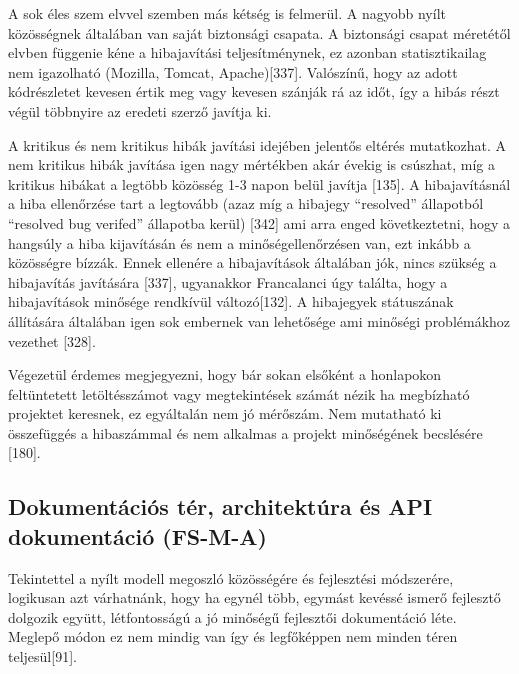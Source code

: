 \documentclass[12pt,magyar,a4paper,oneside]{scrreprt}
\begin{document}
A sok éles szem elvvel szemben más kétség is felmerül. A nagyobb nyílt
közösségnek általában van saját biztonsági csapata. A biztonsági csapat
méretétől elvben függenie kéne a hibajavítási teljesítménynek, ez
azonban statisztikailag nem igazolható (Mozilla, Tomcat,
Apache){[}337{]}. Valószínű, hogy az adott kódrészletet kevesen értik
meg vagy kevesen szánják rá az időt, így a hibás részt végül többnyire
az eredeti szerző javítja ki.

A kritikus és nem kritikus hibák javítási idejében jelentős eltérés
mutatkozhat. A nem kritikus hibák javítása igen nagy mértékben akár
évekig is csúszhat, míg a kritikus hibákat a legtöbb közösség 1-3 napon
belül javítja {[}135{]}. A hibajavításnál a hiba ellenőrzése tart a
legtovább (azaz míg a hibajegy ``resolved'' állapotból ``resolved bug
verifed'' állapotba kerül) {[}342{]} ami arra enged következtetni, hogy
a hangsúly a hiba kijavításán és nem a minőségellenőrzésen van, ezt
inkább a közösségre bízzák. Ennek ellenére a hibajavítások általában
jók, nincs szükség a hibajavítás javítására {[}337{]}, ugyanakkor
Francalanci úgy találta, hogy a hibajavítások minősége rendkívül
változó{[}132{]}. A hibajegyek státuszának állítására általában igen sok
embernek van lehetősége ami minőségi problémákhoz vezethet {[}328{]}.

Végezetül érdemes megjegyezni, hogy bár sokan elsőként a honlapokon
feltüntetett letöltésszámot vagy megtekintések számát nézik ha
megbízható projektet keresnek, ez egyáltalán nem jó mérőszám. Nem
mutatható ki összefüggés a hibaszámmal és nem alkalmas a projekt
minőségének becslésére {[}180{]}.

\hypertarget{sec:FS-M-A}{%
\subsection{Dokumentációs tér, architektúra és API dokumentáció
(FS-M-A)}\label{sec:FS-M-A}}

Tekintettel a nyílt modell megoszló közösségére és fejlesztési
módszerére, logikusan azt várhatnánk, hogy ha egynél több, egymást
kevéssé ismerő fejlesztő dolgozik együtt, létfontosságú a jó minőségű
fejlesztői dokumentáció léte. Meglepő módon ez nem mindig van így és
legfőképpen nem minden téren teljesül{[}91{]}.
\end{document}
